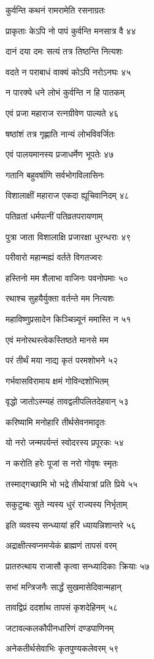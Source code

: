 कुर्वन्ति कथनं रामरामेति रसनाग्रतः

प्राकृताः केऽपि नो पापं कुर्वन्ति मनसात्र वै ४४

दानं दया दमः सत्यं तत्र तिष्ठन्ति नित्यशः

वदते न पराबाधं वाक्यं कोऽपि नरोऽनघः ४५

न पारक्ये धने लोभं कुर्वन्ति न हि पातकम्

एवं प्रजा महाराज रत्नग्रीवेण पाल्यते ४६

षष्ठांशं तत्र गृह्णाति नान्यं लोभविवर्जितः

एवं पालयमानस्य प्रजाधर्मेण भूपतेः ४७

गतानि बहुवर्षाणि सर्वभोगविलासिनः

विशालाक्षीं महाराज एकदा ह्यूचिवानिदम् ४८

पतिव्रतां धर्मपत्नीं पतिव्रतपरायणाम्

पुत्रा जाता विशालाक्षि प्रजारक्षा धुरन्धराः ४९

परीवारो महान्मह्यं वर्तते विगतज्वरः

हस्तिनो मम शैलाभा वाजिनः पवनोपमाः ५०

रथाश्च सुहयैर्युक्ता वर्तन्ते मम नित्यशः

महाविष्णुप्रसादेन किञ्चिन्न्यूनं ममास्ति न ५१

एवं मनोरथस्त्वेकस्तिष्ठते मानसे मम

परं तीर्थं मया नाद्य कृतं परमशोभने ५२

गर्भवासविरामाय क्षमं गोविन्दशोभितम्

वृद्धो जातोऽस्म्यहं तावद्वलीपलितदेहवान् ५३

करिष्यामि मनोहारि तीर्थसेवनमादृतः

यो नरो जन्मपर्यन्तं स्वोदरस्य प्रपूरकः ५४

न करोति हरेः पूजां स नरो गोवृषः स्मृतः

तस्माद्गच्छामि भो भद्रे तीर्थयात्रां प्रति प्रिये ५५

सकुटुम्बः सुते न्यस्य धुरं राज्यस्य निर्भृताम्

इति व्यवस्य सन्ध्यायां हरिं ध्यायन्निशान्तरे ५६

अद्राक्षीत्स्वप्नमप्येकं ब्राह्मणं तापसं वरम्

प्रातरुत्थाय राजासौ कृत्वा सन्ध्यादिकाः क्रियाः ५७

सभां मन्त्रिजनैः सार्द्धं सुखमासेदिवान्महान्

तावद्विप्रं ददर्शाथ तापसं कृशदेहिनम् ५८

जटावल्कलकौपीनधारिणं दण्डपाणिनम्

अनेकतीर्थसेवाभिः कृतपुण्यकलेवरम् ५९


